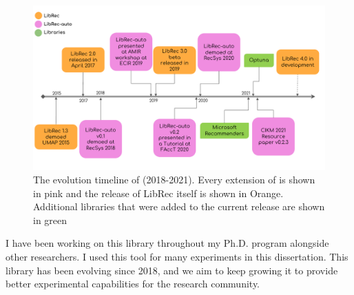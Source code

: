 

\begin{figure}[!htb]
    \centering
    \includegraphics[width=0.95\linewidth]{imgs/la/librec-auto-evolution.pdf}
    \caption{The evolution timeline of \libauto{} (2018-2021). Every extension of \libauto{} is shown in pink and the release of LibRec itself is shown in Orange. Additional libraries that were added to the current release are shown in green}
    \label{fig:librec-auto-evolution}
    \vspace{-0.15in}
\end{figure}

I have been working on this library throughout my Ph.D. program alongside other researchers. I used this tool for many experiments in this dissertation. This library has been evolving since 2018, and we aim to keep growing it to provide better experimental capabilities for the research community. 